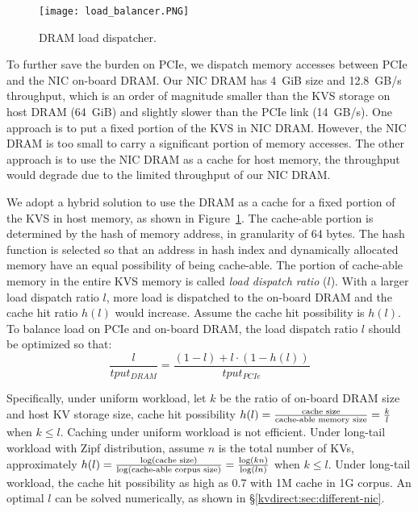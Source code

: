 \begin{figure}[t]
\centering
\texttt{[image: load\_balancer.PNG]}
\caption{DRAM load dispatcher.}
\label{kvdirect:fig:cache}

\end{figure}

To further save the burden on PCIe, we dispatch memory accesses between PCIe and the NIC on-board DRAM.
Our NIC DRAM has 4~GiB size and 12.8~GB/s throughput, which is an order of magnitude smaller than the KVS storage on host DRAM (64~GiB) and slightly slower than the PCIe link (14~GB/s).
One approach is to put a fixed portion of the KVS in NIC DRAM. However, the NIC DRAM is too small to carry a significant portion of memory accesses.
The other approach is to use the NIC DRAM as a cache for host memory, the throughput would degrade due to the limited throughput of our NIC DRAM.

We adopt a hybrid solution to use the DRAM as a cache for a fixed portion of the KVS in host memory, as shown in Figure~\ref{kvdirect:fig:cache}.
The cache-able portion is determined by the hash of memory address, in granularity of 64 bytes. The hash function is selected so that an address in hash index and dynamically allocated memory have an equal possibility of being cache-able.
The portion of cache-able memory in the entire KVS memory is called \textit{load dispatch ratio} ($l$).
With a larger load dispatch ratio $l$, more load is dispatched to the on-board DRAM and the cache hit ratio $h(l)$ would increase.
Assume the cache hit possibility is $h(l)$.
To balance load on PCIe and on-board DRAM, the load dispatch ratio $l$ should be optimized so that:
$$\frac{l}{tput_{DRAM}} = \frac{(1-l) + l \cdot (1-h(l))}{tput_{PCIe}}$$

Specifically, under uniform workload, let $k$ be the ratio of on-board DRAM size and host KV storage size, cache hit possibility $h(l) = \frac{\textnormal{cache size}}{\textnormal{cache-able memory size}} = \frac{k}{l}$ when $k \leq l$.
Caching under uniform workload is not efficient.
Under long-tail workload with Zipf distribution, assume $n$ is the total number of KVs, approximately $h(l) = \frac{\log (\textnormal{cache size})}{\log (\textnormal{cache-able corpus size})} = \frac{\log (kn)}{\log (ln)}$ when $k \leq l$.
Under long-tail workload, the cache hit possibility as high as 0.7 with 1M cache in 1G corpus.
An optimal $l$ can be solved numerically, as shown in \S\ref{kvdirect:sec:different-nic}.

